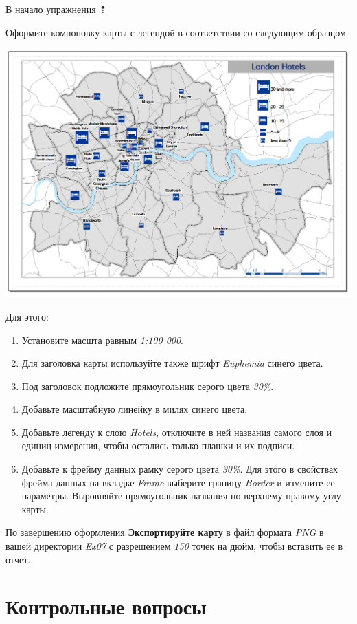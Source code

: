 \documentclass[12pt,]{book}
\begin{document}
\protect\hyperlink{map-ref-economic}{В начало упражнения ⇡}

Оформите компоновку карты с легендой в соответствии со следующим
образцом.

\includegraphics{images/Ex07/image27.png}

Для этого:

\begin{enumerate}
\def\labelenumi{\arabic{enumi}.}
\item
  Установите масшта равным \emph{1:100 000}.
\item
  Для заголовка карты используйте также шрифт \emph{Euphemia} синего цвета.
\item
  Под заголовок подложите прямоугольник серого цвета \emph{30\%}.
\item
  Добавьте масштабную линейку в милях синего цвета.
\item
  Добавьте легенду к слою \emph{Hotels}, отключите в ней названия самого слоя и единиц измерения, чтобы остались только плашки и их подписи.
\item
  Добавьте к фрейму данных рамку серого цвета \emph{30\%}. Для этого в свойствах фрейма данных на вкладке \emph{Frame} выберите границу \emph{Border} и измените ее параметры. Выровняйте прямоугольник названия по верхнему правому углу карты.
\end{enumerate}

По завершению оформления \textbf{Экспортируйте карту} в файл формата \emph{PNG} в вашей директории \emph{Ex07} с разрешением \emph{150} точек на дюйм, чтобы вставить ее в отчет.

\hypertarget{map-ref-economic-questions}{%
\section{Контрольные вопросы}\label{map-ref-economic-questions}}
\end{document}
